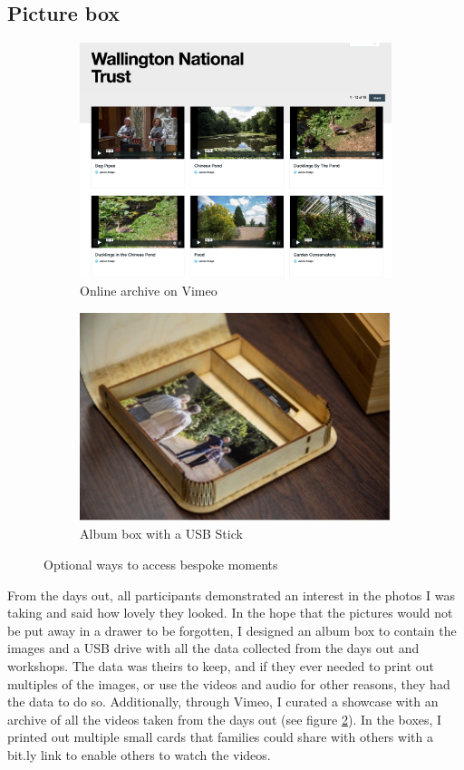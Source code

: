 \subsection{Picture box}
\label{PictureBox}

\begin{figure}[htp]
\centering
\begin{subfigure}{.5\textwidth}
  \centering
  \includegraphics[width=.8\linewidth]{Images/ChapterFour/VimeoWebsite.png}
  \caption{Online archive on Vimeo}
  \label{fig:onlineArchive}
\end{subfigure}%
\begin{subfigure}{.5\textwidth}
  \centering
  \includegraphics[width=.8\linewidth]{Images/ChapterFour/InsidePhotoAlbum.jpg}
  \caption{Album box with a USB Stick}
  \label{fig:AlbumBox}
\end{subfigure}
\caption{Optional ways to access bespoke moments}
\label{fig:OptionalMoments}
\end{figure}

From the days out, all participants demonstrated an interest in the photos I was taking and said how lovely they looked. In the hope that the pictures would not be put away in a drawer to be forgotten, I designed an album box to contain the images and a USB drive with all the data collected from the days out and workshops. The data was theirs to keep, and if they ever needed to print out multiples of the images, or use the videos and audio for other reasons, they had the data to do so. Additionally, through Vimeo, I curated a showcase with an archive of all the videos taken from the days out (see figure \ref{fig:AlbumBox}). In the boxes, I printed out multiple small cards that families could share with others with a bit.ly link to enable others to watch the videos. 

